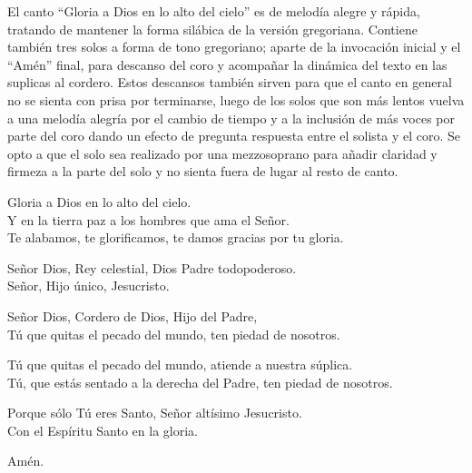 \documentclass[12pt, letterpaper]{report}
\begin{document}
    \Large El canto ``Gloria a Dios en lo alto del cielo'' es de melod\'ia alegre y r\'apida,
    tratando de mantener la forma sil\'abica de la versi\'on gregoriana. Contiene tambi\'en tres
    solos a forma de tono gregoriano; aparte de la invocaci\'on inicial y el ``Am\'en'' final,
    para descanso del coro y acompa\~nar la din\'amica del texto en las suplicas al cordero.
    Estos descansos tambi\'en sirven para que el canto en general no se sienta con prisa por
    terminarse, luego de los solos que son m\'as lentos vuelva a una melod\'ia alegr\'ia por el cambio de
    tiempo y a la inclusi\'on de m\'as voces por parte del coro dando un efecto de pregunta
    respuesta entre el solista y el coro. Se opto a que el solo sea realizado por una
    mezzosoprano para a\~nadir claridad y firmeza a la parte del solo y no sienta fuera de
    lugar al resto de canto.

    \noindent
    \LARGE Gloria a Dios en lo alto del cielo.\\
    Y en la tierra paz a los hombres que ama el Se\~nor. \\
    Te alabamos, te glorificamos, te damos gracias por tu gloria.

    \noindent
    Se\~nor Dios, Rey celestial, Dios Padre todopoderoso. \\
    Se\~nor, Hijo \'unico, Jesucristo.

    \noindent
    Se\~nor Dios, Cordero de Dios, Hijo del Padre, \\
    T\'u que quitas el pecado del mundo, ten piedad de nosotros.

    \noindent
    T\'u que quitas el pecado del mundo, atiende a nuestra s\'uplica. \\
    T\'u, que est\'as sentado a la derecha del Padre, ten piedad de nosotros.

    \noindent
    Porque s\'olo T\'u eres Santo, Se\~nor alt\'isimo Jesucristo. \\
    Con el Esp\'iritu Santo en la gloria.

    \noindent
    Am\'en.
    \clearpage


\end{document}
